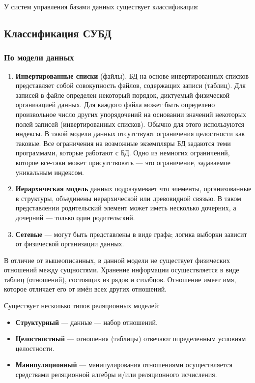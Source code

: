 У систем управления базами данных существует классификация: 

\subsection{Классификация СУБД}

\subsubsection{По модели данных}


\begin{enumerate}[label=\arabic*.]
	\item \textbf{Инвертированные списки} (файлы). БД на основе инвертированных списков представляет собой совокупность файлов, содержащих записи (таблиц). Для записей в файле определен некоторый порядок, диктуемый физической организацией данных. Для каждого файла может быть определено произвольное число других упорядочений на основании значений некоторых полей записей (инвертированных списков). Обычно для этого используются индексы. В такой модели данных отсутствуют ограничения целостности как таковые. Все ограничения на возможные экземпляры БД задаются теми программами, которые работают с БД. Одно из немногих ограничений, которое все-таки может присутствовать --- это ограничение, задаваемое уникальным индексом. 
	\item \textbf{Иерархическая модель} данных подразумевает что элементы, организованные в структуры, объединены иерархической или древовидной связью. В таком представлении родительский элемент может иметь несколько дочерних,
	а дочерний --- только один родительский.
	\item \textbf{Сетевые} --- могут быть представлены в виде графа; логика выборки зависит от физической организации данных.
\end{enumerate}


В отличие от вышеописанных, в данной модели не существует 
физических отношений между сущностями. 
Хранение информации осуществляется
в виде таблиц (отношений), состоящих из рядов и столбцов. 
Отношение имеет
имя, которое отличает его от имён всех других отношений.

Существует несколько типов реляционных моделей:

\begin{itemize}
	\item \textbf{Структурный} --- данные --- набор отношений.
	\item \textbf{Целостностный} --- отношения (таблицы) отвечают определенным условиям целостности.
	\item \textbf{Манипуляционный} --- манипулирования отношениями осуществляется средствами реляционной алгебры и/или реляционного исчисления.
\end{itemize}


